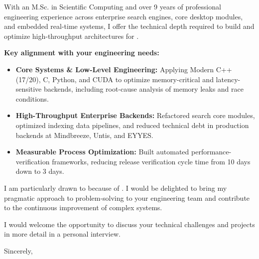 \documentclass[11pt,a4paper]{article}
\begin{document}
With an M.Sc. in Scientific Computing and over 9 years of professional engineering experience across enterprise search engines, core desktop modules, and embedded real-time systems, I offer the technical depth required to build and optimize high-throughput architectures for \textbf{\firmenName}.

\textbf{Key alignment with your engineering needs:}

\begin{itemize}[leftmargin=1.2em, itemsep=0.15em, parsep=0pt, topsep=0.2em]
    \item \textbf{Core Systems \& Low-Level Engineering:} Applying Modern C++ (17/20), C, Python, and CUDA to optimize memory-critical and latency-sensitive backends, including root-cause analysis of memory leaks and race conditions.
    \item \textbf{High-Throughput Enterprise Backends:} Refactored search core modules, optimized indexing data pipelines, and reduced technical debt in production backends at Mindbreeze, Untis, and EYYES.
    \item \textbf{Measurable Process Optimization:} Built automated performance-verification frameworks, reducing release verification cycle time from 10 days down to 3 days.
\end{itemize}

I am particularly drawn to \firmenFlussbezug because of \textit{\firmenHighlight}. I would be delighted to bring my pragmatic approach to problem-solving to your engineering team and contribute to the continuous improvement of complex systems.

I would welcome the opportunity to discuss your technical challenges and projects in more detail in a personal interview.

\vspace{0.6em}

Sincerely,

\vspace{1.2em}

\textbf{\meinName}
\end{document}
